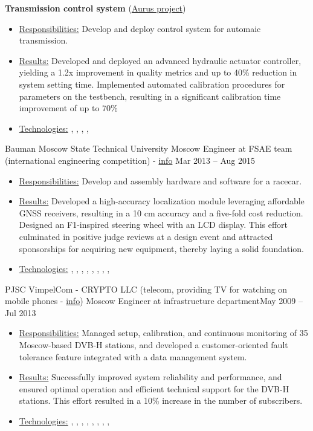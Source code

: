 \textbf{Transmission control system} (\href{https://en.wikipedia.org/wiki/Aurus_Senat}{Aurus project})
\begin{itemize}
    \item[] \underline{Responsibilities:} Develop and deploy control system for automaic transmission.
    \item[] \underline{Results:} Developed and deployed an advanced hydraulic actuator controller, yielding a 1.2x improvement in quality metrics and up to 40\% reduction in system setting time. Implemented automated calibration procedures for parameters on the testbench, resulting in a significant calibration time improvement of up to 70\%
   \item[] \underline{Technologies:} , , , , 
\end{itemize}
\horizontalline
% 
\ressubheading
{Bauman Moscow State Technical University}
{}
{Moscow}
{Engineer at FSAE team (international engineering competition) - \href{https://baumanracing.ru/en/}{info}}
{Mar 2013 -- Aug 2015}
\begin{itemize}
    \item[] \underline{Responsibilities:} Develop and assembly hardware and software for a racecar.
    \item[] \underline{Results:} Developed a high-accuracy localization module leveraging affordable GNSS receivers, resulting in a 10 cm accuracy and a five-fold cost reduction. Designed an F1-inspired steering wheel with an LCD display. This effort culminated in positive judge reviews at a design event and attracted sponsorships for acquiring new equipment, thereby laying a solid foundation.
    \item[] \underline{Technologies:} , , , , , , , , 

\end{itemize}
\horizontalline
% 
\ressubheading
{PJSC VimpelCom - CRYPTO LLC}
{(telecom, providing TV for watching on mobile phones - \href{https://www.dvb.org/news/russia-to-launch-dvb-h-services}{info})}
{Moscow}
{Engineer at infrastructure department}{May 2009 -- Jul 2013}
\begin{itemize}
    \item[] \underline{Responsibilities:} Managed setup, calibration, and continuous monitoring of 35 Moscow-based DVB-H stations, and developed a customer-oriented fault tolerance feature integrated with a data management system.
    \item[] \underline{Results:}  Successfully improved system reliability and performance, and ensured optimal operation and efficient technical support for the DVB-H stations. This effort resulted in a 10\% increase in the number of subscribers.
    \item[] \underline{Technologies:}  , , , , , , , , 
\end{itemize}
